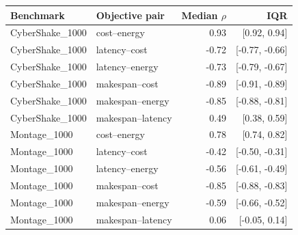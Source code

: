 \begin{tabular}{llrr}
\toprule
Benchmark & Objective pair & Median $\rho$ & IQR \\
\midrule
CyberShake\_1000 & cost--energy & 0.93 & [0.92, 0.94] \\
CyberShake\_1000 & latency--cost & -0.72 & [-0.77, -0.66] \\
CyberShake\_1000 & latency--energy & -0.73 & [-0.79, -0.67] \\
CyberShake\_1000 & makespan--cost & -0.89 & [-0.91, -0.89] \\
CyberShake\_1000 & makespan--energy & -0.85 & [-0.88, -0.81] \\
CyberShake\_1000 & makespan--latency & 0.49 & [0.38, 0.59] \\
Montage\_1000 & cost--energy & 0.78 & [0.74, 0.82] \\
Montage\_1000 & latency--cost & -0.42 & [-0.50, -0.31] \\
Montage\_1000 & latency--energy & -0.56 & [-0.61, -0.49] \\
Montage\_1000 & makespan--cost & -0.85 & [-0.88, -0.83] \\
Montage\_1000 & makespan--energy & -0.59 & [-0.66, -0.52] \\
Montage\_1000 & makespan--latency & 0.06 & [-0.05, 0.14] \\
\bottomrule
\end{tabular}
